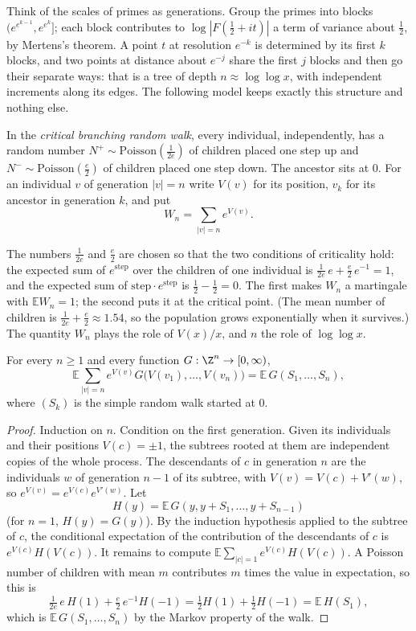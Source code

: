 Think of the scales of primes as generations. Group the primes into blocks $(e^{e^{k-1}},e^{e^k}]$; each block contributes to $\log|F(\frac12+it)|$ a term of variance about $\frac12$, by Mertens's theorem. A point $t$ at resolution $e^{-k}$ is determined by its first $k$ blocks, and two points at distance about $e^{-j}$ share the first $j$ blocks and then go their separate ways: that is a tree of depth $n\approx\log\log x$, with independent increments along its edges. The following model keeps exactly this structure and nothing else.

\begin{definition}\label{def:brw}
In the \emph{critical branching random walk}, every individual, independently, has a random number $N^+\sim\mathrm{Poisson}(\frac1{2e})$ of children placed one step up and $N^-\sim\mathrm{Poisson}(\frac e2)$ of children placed one step down. The ancestor sits at $0$. For an individual $v$ of generation $|v|=n$ write $V(v)$ for its position, $v_k$ for its ancestor in generation $k$, and put
\[
W_n=\sum_{|v|=n}e^{V(v)}.
\]
\end{definition}

The numbers $\frac1{2e}$ and $\frac e2$ are chosen so that the two conditions of criticality hold: the expected sum of $e^{\text{step}}$ over the children of one individual is $\frac1{2e}\,e+\frac e2\,e^{-1}=1$, and the expected sum of $\text{step}\cdot e^{\text{step}}$ is $\frac12-\frac12=0$. The first makes $W_n$ a martingale with $\mathbb EW_n=1$; the second puts it at the critical point. (The mean number of children is $\frac1{2e}+\frac e2\approx1.54$, so the population grows exponentially when it survives.) The quantity $W_n$ plays the role of $V(x)/x$, and $n$ the role of $\log\log x$.

\begin{lemma}\label{lem:manytoone}
For every $n\ge1$ and every function $G:\Z^n\to[0,\infty)$,
\[
\mathbb E\sum_{|v|=n}e^{V(v)}G\bigl(V(v_1),\dots,V(v_n)\bigr)=\mathbb E\,G(S_1,\dots,S_n),
\]
where $(S_k)$ is the simple random walk started at $0$.
\end{lemma}

\begin{proof}
Induction on $n$. Condition on the first generation. Given its individuals and their positions $V(c)=\pm1$, the subtrees rooted at them are independent copies of the whole process. The descendants of $c$ in generation $n$ are the individuals $w$ of generation $n-1$ of its subtree, with $V(v)=V(c)+V'(w)$, so $e^{V(v)}=e^{V(c)}e^{V'(w)}$. Let
\[
H(y)=\mathbb E\,G(y,y+S_1,\dots,y+S_{n-1})
\]
(for $n=1$, $H(y)=G(y)$). By the induction hypothesis applied to the subtree of $c$, the conditional expectation of the contribution of the descendants of $c$ is $e^{V(c)}H(V(c))$. It remains to compute $\mathbb E\sum_{|c|=1}e^{V(c)}H(V(c))$. A Poisson number of children with mean $m$ contributes $m$ times the value in expectation, so this is
\[
\tfrac1{2e}\,e\,H(1)+\tfrac e2\,e^{-1}H(-1)=\tfrac12H(1)+\tfrac12H(-1)=\mathbb E\,H(S_1),
\]
which is $\mathbb E\,G(S_1,\dots,S_n)$ by the Markov property of the walk.
\end{proof}

